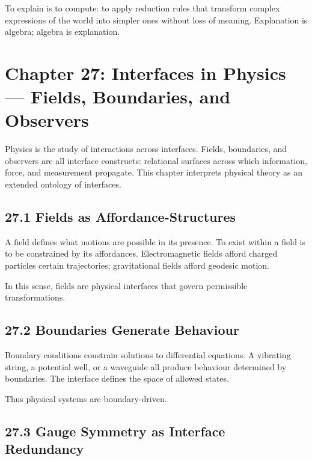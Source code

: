 \documentclass[12pt,letterpaper]{article}
\theoremstyle{remark}
\begin{document}
To explain is to compute: to apply reduction rules that transform complex expressions of the world into simpler ones without loss of meaning. Explanation is algebra; algebra is explanation.

\newpage

\section{Chapter 27: Interfaces in Physics — Fields, Boundaries, and Observers}

Physics is the study of interactions across interfaces. Fields, boundaries, and observers are all interface constructs: relational surfaces across which information, force, and measurement propagate. This chapter interprets physical theory as an extended ontology of interfaces.

\subsection{27.1 Fields as Affordance-Structures}

A field defines what motions are possible in its presence. To exist within a field is to be constrained by its affordances. Electromagnetic fields afford charged particles certain trajectories; gravitational fields afford geodesic motion.

In this sense, fields are physical interfaces that govern permissible transformations.

\subsection{27.2 Boundaries Generate Behaviour}

Boundary conditions constrain solutions to differential equations. A vibrating string, a potential well, or a waveguide all produce behaviour determined by boundaries. The interface defines the space of allowed states.

Thus physical systems are boundary-driven.

\subsection{27.3 Gauge Symmetry as Interface Redundancy}
\end{document}
